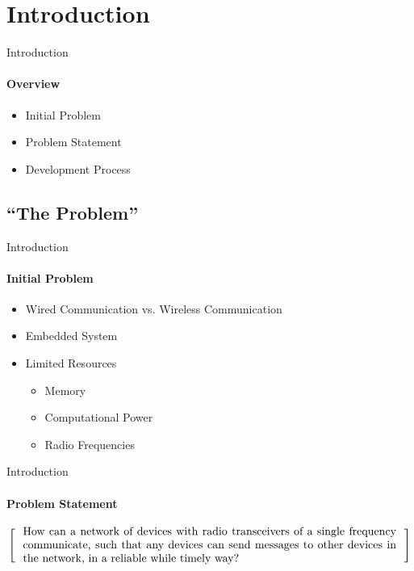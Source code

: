 \section{Introduction}
\begin{frame}{Introduction}\framesubtitle{Overview}
    \begin{itemize}
        \item Initial Problem
        \item Problem Statement
        \item Development Process 
    \end{itemize}
\end{frame}
\subsection{``The Problem''}
\begin{frame}{Introduction}\framesubtitle{Initial Problem}
	\begin{itemize}
        \item Wired Communication vs. Wireless Communication
        \item Embedded System 
        \item Limited Resources
            \begin{itemize}
                \item Memory
                \item Computational Power
                \item Radio Frequencies
            \end{itemize}
    \end{itemize}

\end{frame}
\begin{frame}{Introduction}\framesubtitle{Problem Statement}
\[
\left[
\begin{minipage}{\textwidth}
\centering
\begin{minipage}{0.96\textwidth}
How can a network of devices with radio transceivers of a single frequency communicate, such that any devices can send messages to other devices in the network, in a reliable while timely way?
\end{minipage}
\end{minipage}
\right]
\]
\end{frame}
